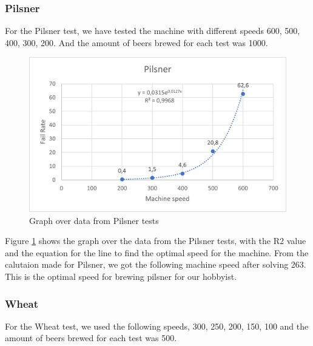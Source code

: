 \subsubsection{Pilsner}
For the Pilsner test, we have tested the machine with different speeds 600, 500, 400, 300, 200. And the amount of beers brewed for each test was 1000.

\begin{center}
    \centering
    \begin{figure}[H]
        \includegraphics[width=1\textwidth]{img/Pilsner_graph.png}
        \caption{Graph over data from Pilsner tests}
        \label{fig:Pilsner_graph}
    \end{figure}
\end{center}

Figure \ref{fig:Pilsner_graph} shows the graph over the data from the Pilsner tests, with the R2 value and the equation for the line to find the optimal speed for the machine. \newline
From the calutaion made for Pilsner, we got the following machine speed after solving 263. This is the optimal speed for brewing pilsner for our hobbyist. \newline

\subsubsection{Wheat}
For the Wheat test, we used the following speeds, 300, 250, 200, 150, 100 and the amount of beers brewed for each test was 500.


